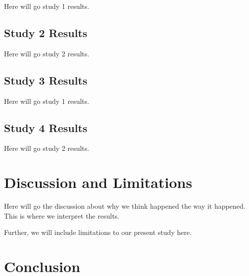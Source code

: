 \documentclass[letterpaper]{article} %
\begin{document}
Here will go study 1 results.

\subsection{Study 2 Results}

Here will go study 2 results.

\subsection{Study 3 Results}

Here will go study 1 results.

\subsection{Study 4 Results}

Here will go study 2 results.

\section{Discussion and Limitations} 

Here will go the discussion about why we think happened the way it happened. This is where we interpret the results. 

Further, we will include limitations to our present study here.



\section{Conclusion}

\newpage



% 
\end{document}
